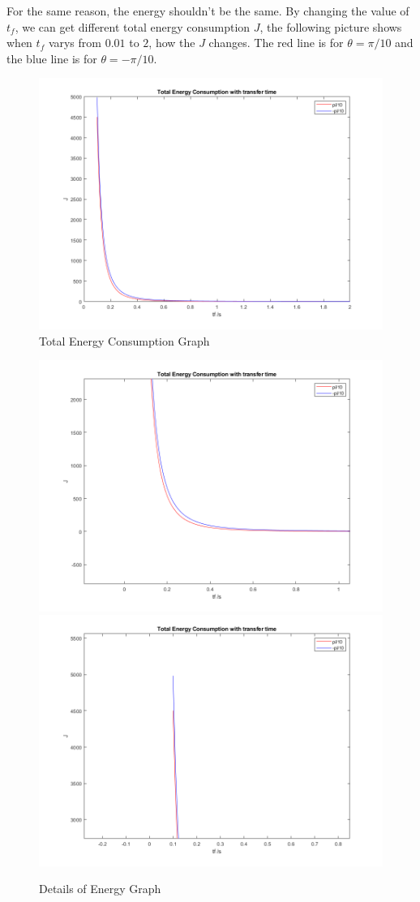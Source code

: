 \documentclass{article}
\begin{document}
For the same reason, the energy shouldn't be the same. By changing the value of $t_f$, we can get different total energy consumption $J$, the following picture shows when $t_f$ varys from $0.01$ to $2$, how the $J$ changes. The red line is for $\theta = \pi/10$ and the blue line is for $\theta = - \pi/10$.

\begin{figure}[H]
\centering
\includegraphics[width=0.6\linewidth]{Part_C_e_1.png}
\caption{Total Energy Consumption Graph}
\end{figure}

\begin{figure}[H]
\includegraphics[width=0.5\linewidth]{Part_C_e_2.png}
\includegraphics[width=0.5\linewidth]{Part_C_e_3.png}
\caption{Details of Energy Graph}
\end{figure}
\end{document}
